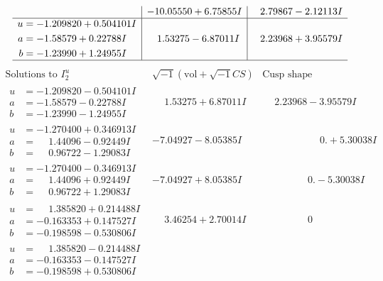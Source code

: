 \documentclass[1p]{elsarticle_modified}
\theoremstyle{definition}
\newcommand{\I}{\sqrt{-1}}
\begin{document}
$$\begin{array}{c|c|c}
 & -10.05550 + 6.75855 I & \phantom{-}2.79867 - 2.12113 I \\ \hline\begin{aligned}
u &= -1.209820 + 0.504101 I \\
a &= -1.58579 + 0.22788 I \\
b &= -1.23990 + 1.24955 I\end{aligned}
 & \phantom{-}1.53275 - 6.87011 I & \phantom{-}2.23968 + 3.95579 I\\
 \hline 
 \end{array}$$\newpage$$\begin{array}{c|c|c}  
\text{Solutions to }I^u_{2}& \I (\text{vol} + \sqrt{-1}CS) & \text{Cusp shape}\\
 \hline 
\begin{aligned}
u &= -1.209820 - 0.504101 I \\
a &= -1.58579 - 0.22788 I \\
b &= -1.23990 - 1.24955 I\end{aligned}
 & \phantom{-}1.53275 + 6.87011 I & \phantom{-}2.23968 - 3.95579 I \\ \hline\begin{aligned}
u &= -1.270400 + 0.346913 I \\
a &= \phantom{-}1.44096 - 0.92449 I \\
b &= \phantom{-}0.96722 - 1.29083 I\end{aligned}
 & -7.04927 - 8.05385 I & \phantom{-0.000000 -}0. + 5.30038 I \\ \hline\begin{aligned}
u &= -1.270400 - 0.346913 I \\
a &= \phantom{-}1.44096 + 0.92449 I \\
b &= \phantom{-}0.96722 + 1.29083 I\end{aligned}
 & -7.04927 + 8.05385 I & \phantom{-0.000000 } 0. - 5.30038 I \\ \hline\begin{aligned}
u &= \phantom{-}1.385820 + 0.214488 I \\
a &= -0.163353 + 0.147527 I \\
b &= -0.198598 - 0.530806 I\end{aligned}
 & \phantom{-}3.46254 + 2.70014 I & \phantom{-0.000000 } 0 \\ \hline\begin{aligned}
u &= \phantom{-}1.385820 - 0.214488 I \\
a &= -0.163353 - 0.147527 I \\
b &= -0.198598 + 0.530806 I\end{aligned}

\end{array}$$
\end{document}
